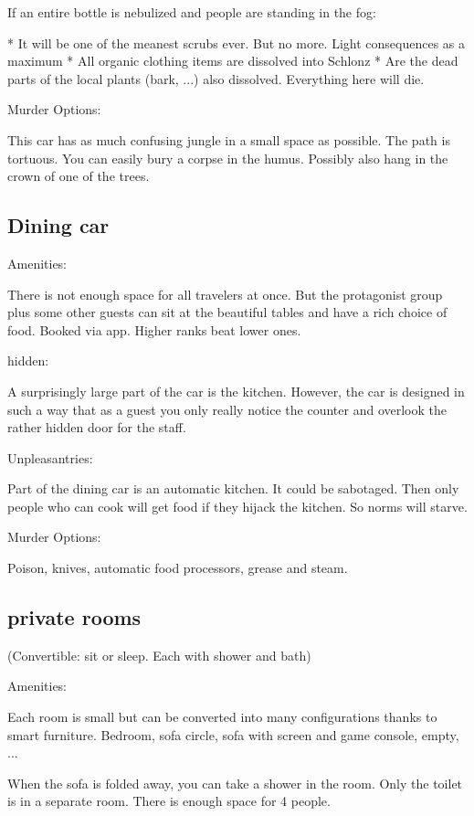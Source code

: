 \documentclass{book}
\begin{document}
If an entire bottle is nebulized and people are standing in the fog:

* It will be one of the meanest scrubs ever. But no more. Light consequences as a maximum
* All organic clothing items are dissolved into Schlonz
* Are the dead parts of the local plants (bark, ...) also dissolved. Everything here will die.

Murder Options:

This car has as much confusing jungle in a small space as possible. The path is tortuous. You can easily bury a corpse in the humus. Possibly also hang in the crown of one of the trees.


\subsection{Dining car}


Amenities:

There is not enough space for all travelers at once. But the protagonist group plus some other guests can sit at the beautiful tables and have a rich choice of food. Booked via app. Higher ranks beat lower ones.

hidden:

A surprisingly large part of the car is the kitchen. However, the car is designed in such a way that as a guest you only really notice the counter and overlook the rather hidden door for the staff.

Unpleasantries:

Part of the dining car is an automatic kitchen. It could be sabotaged. Then only people who can cook will get food if they hijack the kitchen. So norms will starve.

Murder Options:

Poison, knives, automatic food processors, grease and steam.

\subsection{private rooms}

(Convertible: sit or sleep. Each with shower and bath)

Amenities:

Each room is small but can be converted into many configurations thanks to smart furniture. Bedroom, sofa circle, sofa with screen and game console, empty, ...

When the sofa is folded away, you can take a shower in the room. Only the toilet is in a separate room.
There is enough space for 4 people.
\end{document}
